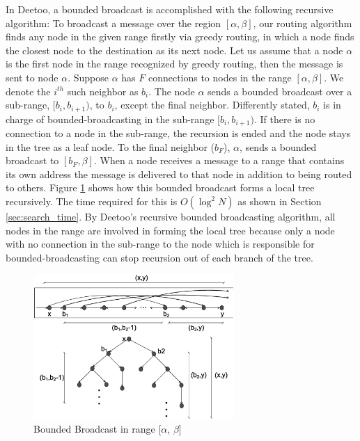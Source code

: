 In Deetoo, a bounded broadcast is accomplished with the following 
recursive algorithm:  
To broadcast a message over the region $[\alpha, \beta]$, 
our routing algorithm finds any node in the given range firstly via greedy routing,
in which a node finds the closest node to the destination as its next node.
Let us assume that a node $\alpha$ is the first node in the range recognized by greedy routing, 
then the message is sent to node $\alpha$. 
Suppose $\alpha$ has $F$ connections to nodes in the range $[\alpha, \beta]$. 
We denote the $i^{th}$ such neighbor as $b_i$.
The node $\alpha$ sends a bounded broadcast over a sub-range, 
$[b_i, b_{i+1})$, to $b_i$, except the final neighbor. 
Differently stated, $b_i$ is in charge of bounded-broadcasting 
in the sub-range $[b_i, b_{i+1})$. If there is no connection to a node in the sub-range, 
the recursion is ended and the node stays in the tree as a leaf node.
To the final
neighbor ($b_F$), $\alpha$, sends a bounded broadcast to $[b_F, \beta]$.
When a node receives a message to a range that contains its own address
the message is delivered to that node in addition to being routed to others.
Figure \ref{fig:tree} shows how this bounded broadcast forms a local 
tree recursively. The time required for this is $O(\log^2 N)$ as 
shown in Section \ref{sec:search_time}.
By Deetoo's recursive bounded broadcasting algorithm, all nodes in the range 
are involved in forming the local tree because only a node with no connection 
in the sub-range to the node which is responsible for bounded-broadcasting 
can stop recursion out of each branch of the tree.

\begin{figure}
\centering
\includegraphics[width=3.0in]{tree}
\caption{Bounded Broadcast in range [$\alpha$, $\beta$]} \label{fig:tree}
\end{figure}

